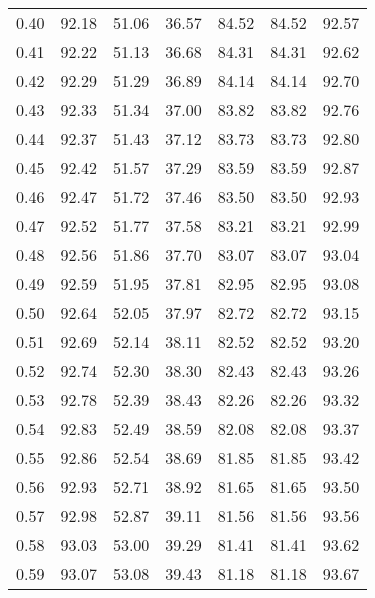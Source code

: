 \begin{tabular}{|c|c|c|c|c|c|c|}
      0.40 &     92.18 &     51.06 &      36.57 &   84.52 &      84.52 &         92.57 \\
      0.41 &     92.22 &     51.13 &      36.68 &   84.31 &      84.31 &         92.62 \\
      0.42 &     92.29 &     51.29 &      36.89 &   84.14 &      84.14 &         92.70 \\
      0.43 &     92.33 &     51.34 &      37.00 &   83.82 &      83.82 &         92.76 \\
      0.44 &     92.37 &     51.43 &      37.12 &   83.73 &      83.73 &         92.80 \\
      0.45 &     92.42 &     51.57 &      37.29 &   83.59 &      83.59 &         92.87 \\
      0.46 &     92.47 &     51.72 &      37.46 &   83.50 &      83.50 &         92.93 \\
      0.47 &     92.52 &     51.77 &      37.58 &   83.21 &      83.21 &         92.99 \\
      0.48 &     92.56 &     51.86 &      37.70 &   83.07 &      83.07 &         93.04 \\
      0.49 &     92.59 &     51.95 &      37.81 &   82.95 &      82.95 &         93.08 \\
      0.50 &     92.64 &     52.05 &      37.97 &   82.72 &      82.72 &         93.15 \\
      0.51 &     92.69 &     52.14 &      38.11 &   82.52 &      82.52 &         93.20 \\
      0.52 &     92.74 &     52.30 &      38.30 &   82.43 &      82.43 &         93.26 \\
      0.53 &     92.78 &     52.39 &      38.43 &   82.26 &      82.26 &         93.32 \\
      0.54 &     92.83 &     52.49 &      38.59 &   82.08 &      82.08 &         93.37 \\
      0.55 &     92.86 &     52.54 &      38.69 &   81.85 &      81.85 &         93.42 \\
      0.56 &     92.93 &     52.71 &      38.92 &   81.65 &      81.65 &         93.50 \\
      0.57 &     92.98 &     52.87 &      39.11 &   81.56 &      81.56 &         93.56 \\
      0.58 &     93.03 &     53.00 &      39.29 &   81.41 &      81.41 &         93.62 \\
      0.59 &     93.07 &     53.08 &      39.43 &   81.18 &      81.18 &         93.67 \\

\end{tabular}
